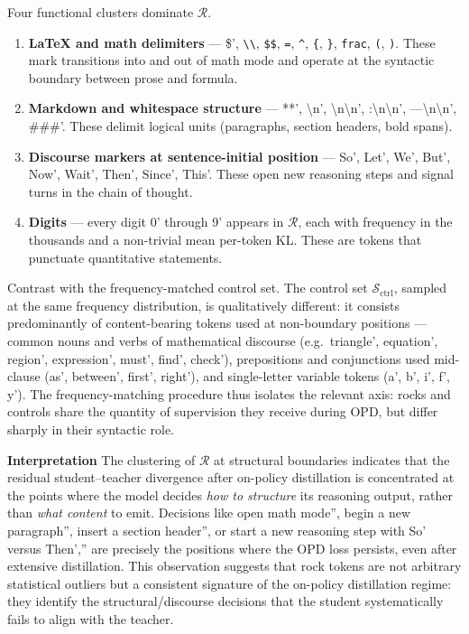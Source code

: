 Four functional clusters dominate $\mathcal{R}$.
\begin{enumerate}
\item \textbf{LaTeX and math delimiters} — \$', \verb|\\|, \verb|$$|, \verb|=|, \verb|^|, \verb|{|, \verb|}|, \verb|frac|, \verb|(|, \verb|)|. These mark transitions into and out of math mode and operate at the syntactic boundary between prose and formula.   \item \textbf{Markdown and whitespace structure} — **', \textbackslash n', \textbackslash n\textbackslash n', :\textbackslash n\textbackslash n', ---\textbackslash n\textbackslash n', \#\#\#'. These delimit logical units (paragraphs, section headers, bold spans).   \item \textbf{Discourse markers at sentence-initial position} — So', Let', We', But', Now', Wait', Then', Since', This'. These open new reasoning steps and signal turns in the chain of thought.
\item \textbf{Digits} — every digit 0' through 9' appears in $\mathcal{R}$, each with frequency in the thousands and a non-trivial mean per-token KL. These are tokens that punctuate quantitative statements.
\end{enumerate}

Contrast with the frequency-matched control set. The control set $\mathcal{S}_{\text{ctrl}}$, sampled at the same frequency distribution, is qualitatively different: it consists predominantly of content-bearing tokens used at non-boundary positions — common nouns and verbs of mathematical discourse (e.g.\ triangle', equation', region', expression', must', find', check'), prepositions and conjunctions used mid-clause (as', between', first', right'), and single-letter variable tokens (a', b', i', f', y'). The frequency-matching procedure thus isolates the relevant axis: rocks and controls share the quantity of supervision they receive during OPD, but differ sharply in their syntactic role.

\textbf{Interpretation} The clustering of $\mathcal{R}$ at structural boundaries indicates that the residual student–teacher divergence after on-policy distillation is concentrated at the points where the model decides \emph{how to structure} its reasoning output, rather than \emph{what content} to emit. Decisions like open math mode'', begin a new paragraph'', insert a section header'', or start a new reasoning step with So' versus Then','' are precisely the positions where the OPD loss persists, even after extensive distillation. This observation suggests that rock tokens are not arbitrary statistical outliers but a consistent signature of the on-policy distillation regime: they identify the structural/discourse decisions that the student systematically fails to align with the teacher.